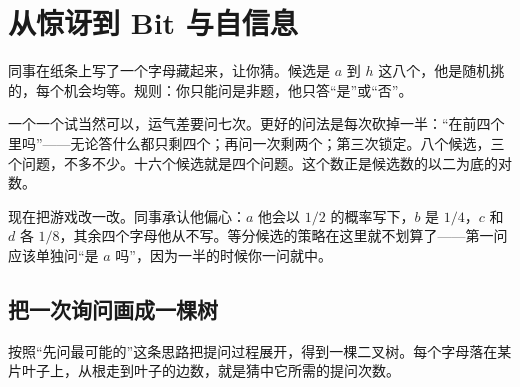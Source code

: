 \section{从惊讶到 Bit 与自信息}
\label{sec:07-Information-Theory/01-Information-and-Entropy/01}

同事在纸条上写了一个字母藏起来，让你猜。候选是 \(a\) 到 \(h\) 这八个，他是随机挑的，每个机会均等。规则：你只能问是非题，他只答``是''或``否''。

一个一个试当然可以，运气差要问七次。更好的问法是每次砍掉一半：``在前四个里吗''——无论答什么都只剩四个；再问一次剩两个；第三次锁定。八个候选，三个问题，不多不少。十六个候选就是四个问题。这个数正是候选数的以二为底的对数。

现在把游戏改一改。同事承认他偏心：\(a\) 他会以 \(1/2\) 的概率写下，\(b\) 是 \(1/4\)，\(c\) 和 \(d\) 各 \(1/8\)，其余四个字母他从不写。等分候选的策略在这里就不划算了——第一问应该单独问``是 \(a\) 吗''，因为一半的时候你一问就中。

\subsection{把一次询问画成一棵树}

按照``先问最可能的''这条思路把提问过程展开，得到一棵二叉树。每个字母落在某片叶子上，从根走到叶子的边数，就是猜中它所需的提问次数。


